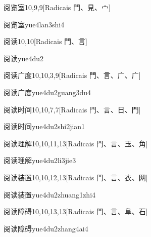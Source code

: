 \begin{entry}{阅览室}{10,9,9}[Radicais ⾨、⾒、⼧]
  \begin{phonetics}{阅览室}{yue4lan3shi4}
  \end{phonetics}
\end{entry}

\begin{entry}{阅读}{10,10}[Radicais ⾨、⾔]
  \begin{phonetics}{阅读}{yue4du2}
  \end{phonetics}
\end{entry}

\begin{entry}{阅读广度}{10,10,3,9}[Radicais ⾨、⾔、⼴、⼴]
  \begin{phonetics}{阅读广度}{yue4du2guang3du4}
  \end{phonetics}
\end{entry}

\begin{entry}{阅读时间}{10,10,7,7}[Radicais ⾨、⾔、⽇、⾨]
  \begin{phonetics}{阅读时间}{yue4du2shi2jian1}
  \end{phonetics}
\end{entry}

\begin{entry}{阅读理解}{10,10,11,13}[Radicais ⾨、⾔、⽟、⾓]
  \begin{phonetics}{阅读理解}{yue4du2li3jie3}
  \end{phonetics}
\end{entry}

\begin{entry}{阅读装置}{10,10,12,13}[Radicais ⾨、⾔、⾐、⽹]
  \begin{phonetics}{阅读装置}{yue4du2zhuang1zhi4}
  \end{phonetics}
\end{entry}

\begin{entry}{阅读障碍}{10,10,13,13}[Radicais ⾨、⾔、⾩、⽯]
  \begin{phonetics}{阅读障碍}{yue4du2zhang4ai4}
  \end{phonetics}
\end{entry}

